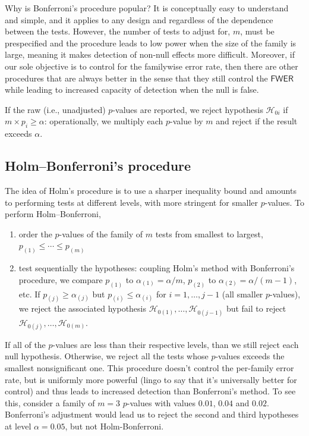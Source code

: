 \documentclass[
  11pt,
  letterpaper,
]{scrbook}
\providecommand{\tightlist}{%
  \setlength{\itemsep}{0pt}\setlength{\parskip}{0pt}}\usepackage{longtable,booktabs,array}
\theoremstyle{definition}
\theoremstyle{definition}
\theoremstyle{remark}
\begin{document}
Why is Bonferroni's procedure popular? It is conceptually easy to
understand and simple, and it applies to any design and regardless of
the dependence between the tests. However, the number of tests to adjust
for, \(m\), must be prespecified and the procedure leads to low power
when the size of the family is large, meaning it makes detection of
non-null effects more difficult. Moreover, if our sole objective is to
control for the familywise error rate, then there are other procedures
that are always better in the sense that they still control the
\(\mathsf{FWER}\) while leading to increased capacity of detection when
the null is false.

If the raw (i.e., unadjusted) \(p\)-values are reported, we reject
hypothesis \(\mathscr{H}_{0i}\) if \(m \times p_i \ge \alpha\):
operationally, we multiply each \(p\)-value by \(m\) and reject if the
result exceeds \(\alpha\).

\subsection{Holm--Bonferroni's
procedure}\label{holmbonferronis-procedure}

The idea of Holm's procedure is to use a sharper inequality bound and
amounts to performing tests at different levels, with more stringent for
smaller \(p\)-values. To perform Holm--Bonferroni,

\begin{enumerate}
\def\labelenumi{\arabic{enumi}.}
\tightlist
\item
  order the \(p\)-values of the family of \(m\) tests from smallest to
  largest, \(p_{(1)} \leq \cdots \leq p_{(m)}\)
\item
  test sequentially the hypotheses: coupling Holm's method with
  Bonferroni's procedure, we compare \(p_{(1)}\) to
  \(\alpha_{(1)} = \alpha/m\), \(p_{(2)}\) to
  \(\alpha_{(2)}=\alpha/(m-1)\), etc. If \(p_{(j)} \geq \alpha_{(j)}\)
  but \(p_{(i)} \leq \alpha_{(i)}\) for \(i=1, \ldots, j-1\) (all
  smaller \(p\)-values), we reject the associated hypothesis
  \(\mathscr{H}_{0(1)}, \ldots, \mathscr{H}_{0(j-1)}\) but fail to
  reject \(\mathscr{H}_{0(j)}, \ldots, \mathscr{H}_{0(m)}\).
\end{enumerate}

If all of the \(p\)-values are less than their respective levels, than
we still reject each null hypothesis. Otherwise, we reject all the tests
whose \(p\)-values exceeds the smallest nonsignificant one. This
procedure doesn't control the per-family error rate, but is uniformly
more powerful (lingo to say that it's universally better for control)
and thus leads to increased detection than Bonferroni's method. To see
this, consider a family of \(m=3\) \(p\)-values with values \(0.01\),
\(0.04\) and \(0.02\). Bonferroni's adjustment would lead us to reject
the second and third hypotheses at level \(\alpha=0.05\), but not
Holm-Bonferroni.
\end{document}
